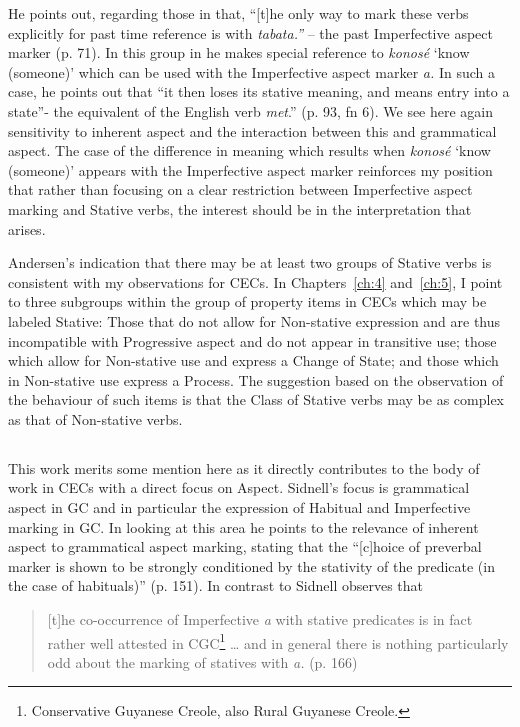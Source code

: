 He points out, regarding those in  that, “[t]he only way
to mark these verbs explicitly for past time reference is with
\textit{tabata.”} – the past Imperfective aspect marker (p. 71).  In
this group in  he makes special reference to
\textit{konosé} ‘know (someone)’ which can be used with the
Imperfective aspect marker \textit{a.} In such a case, he points out
that “it then loses its stative meaning, and means entry into a
state”- the equivalent of the English verb \textit{met}.'' (p. 93, fn 6).
We see here again sensitivity to inherent aspect and the interaction
between this and grammatical aspect.  The case of the difference in
meaning which results when \textit{konosé} `know (someone)' appears
with the Imperfective aspect marker reinforces my position that rather
than focusing on a clear restriction between Imperfective aspect
marking and Stative verbs, the interest should be in the
interpretation that arises.

Andersen’s indication that there may be at least two groups of Stative
verbs is consistent with my observations for CECs.  In Chapters~\ref{ch:4} and~\ref{ch:5}, 
I point to three subgroups within the group of property items in
CECs which may be labeled Stative: Those that do not allow for
Non-stative expression and are thus incompatible with Progressive
aspect and do not appear in transitive use; those which allow for
Non-stative use and express a Change of State; and those which in
Non-stative use express a Process.  The suggestion based on the
observation of the behaviour of such items is that the Class of
Stative verbs may be as complex as that of Non-stative verbs.

\subsection{\citet{Sidnell2002}} %

This work merits some mention here as it directly contributes to the
body of work in CECs with a direct focus on Aspect.  Sidnell’s focus
is grammatical aspect in GC and in particular the expression of
Habitual and Imperfective marking in GC.  In looking at this area he
points to the relevance of inherent aspect to grammatical aspect
marking, stating that the “[c]hoice of preverbal marker is shown to be
strongly conditioned by the stativity of the predicate (in the case of
habituals)” (p. 151).  In contrast to \citet{Bickerton1975} Sidnell
observes that

\begin{quote}
[t]he co-occurrence of Imperfective \textit{a} with stative predicates
is in fact rather well attested in CGC\footnote{Conservative Guyanese
  Creole, also Rural Guyanese Creole.} … and in general there is nothing
particularly odd about the marking of statives with \textit{a.}
(p. 166)
\end{quote}

